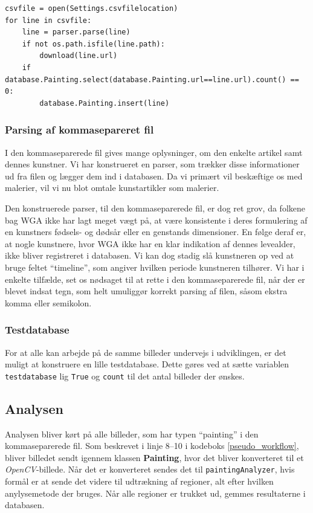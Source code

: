 {\begin{lstlisting}[caption={Pseudokode for database
    initialisering},frame=tb,label={pseudo_init_db}, captionpos=b,
    float=h]
csvfile = open(Settings.csvfilelocation)
for line in csvfile:
	line = parser.parse(line)
	if not os.path.isfile(line.path):
		download(line.url)
	if database.Painting.select(database.Painting.url==line.url).count() == 0:
		database.Painting.insert(line)
\end{lstlisting}

\subsubsection{Parsing af kommasepareret fil}
I den kommaseparerede fil gives mange oplysninger, om den enkelte
artikel samt dennes kunstner.  Vi har konstrueret en parser, som trækker
disse informationer ud fra filen og lægger dem ind i databasen. Da vi
primært vil beskæftige os med malerier, vil vi nu blot omtale
kunstartikler som malerier.

Den konstruerede parser, til den kommaseparerede fil, er dog ret grov,
da folkene bag WGA ikke har lagt meget vægt på, at være konsistente i
deres formulering af en kunstners fødsels- og dødsår eller en genstands
dimensioner. En følge deraf er, at nogle kunstnere, hvor WGA ikke har en
klar indikation af dennes levealder, ikke bliver registreret i
databasen. Vi kan dog stadig slå kunstneren op ved at bruge feltet
``timeline'', som angiver hvilken periode kunstneren tilhører. Vi har i
enkelte tilfælde, set os nødsaget til at rette i den kommaseparerede
fil, når der er blevet indsat tegn, som helt umuliggør korrekt parsing
af filen, såsom ekstra komma eller semikolon.

\subsubsection{Testdatabase}\label{test_db}
For at alle kan arbejde på de samme billeder undervejs i udviklingen, er
det muligt at konstruere en lille testdatabase.  Dette
gøres ved at sætte variablen \texttt{testdatabase} lig \texttt{True} og
\texttt{count} til det antal billeder der ønskes. 

\subsection{Analysen}
Analysen bliver kørt på alle billeder, som har typen ``painting'' i den
kommaseparerede fil. Som beskrevet i linje 8--10 i kodeboks
\ref{pseudo_workflow}, bliver billedet sendt igennem klassen
\textbf{Painting}, hvor det bliver konverteret til et
\emph{OpenCV}-billede. Når det er konverteret sendes det til
\texttt{paintingAnalyzer}, hvis formål er at sende det videre til
udtrækning af regioner, alt efter hvilken anylysemetode der bruges. Når
alle regioner er trukket ud, gemmes resultaterne i databasen.

}
